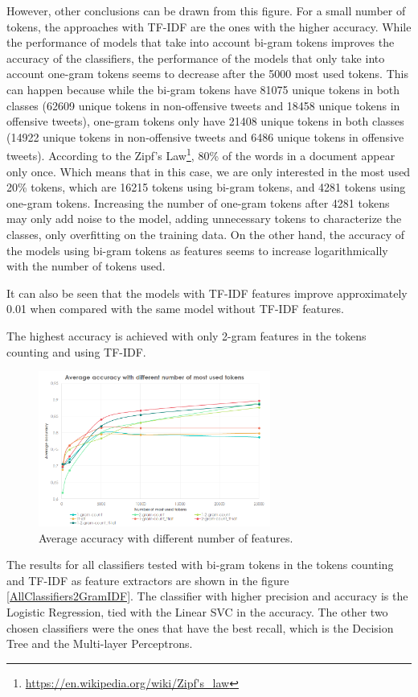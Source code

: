 \documentclass[journal]{IEEEtran}
\begin{document}
However, other conclusions can be drawn from this figure. For a small number of tokens, the approaches with TF-IDF are the ones with the higher accuracy. While the performance of models that take into account bi-gram tokens improves the accuracy of the classifiers, the performance of the models that only take into account one-gram tokens seems to decrease after the 5000 most used tokens. This can happen because while the bi-gram tokens have 81075 unique tokens in both classes (62609 unique tokens in non-offensive tweets and 18458 unique tokens in offensive tweets), one-gram tokens only have 21408 unique tokens in both classes (14922 unique tokens in non-offensive tweets and 6486 unique tokens in offensive tweets). According to the Zipf's Law\footnote{\url{https://en.wikipedia.org/wiki/Zipf's_law}}, 80\% of the words in a document appear only once. Which means that in this case, we are only interested in the most used 20\% tokens, which are 16215 tokens using bi-gram tokens, and 4281 tokens using one-gram tokens. Increasing the number of one-gram tokens after 4281 tokens may only add noise to the model, adding unnecessary tokens to characterize the classes, only overfitting on the training data. On the other hand, the accuracy of the models using bi-gram tokens as features seems to increase logarithmically with the number of tokens used.

It can also be seen that the models with TF-IDF features improve approximately 0.01 when compared with the same model without TF-IDF features.

The highest accuracy is achieved with only 2-gram features in the tokens counting and using TF-IDF.

\begin{figure}[!t]
\centering
\includegraphics[width=3in]{AccFeatures_w}
\caption{Average accuracy with different number of features.}
\label{averageAccFeatures}
\end{figure}

The results for all classifiers tested with bi-gram tokens in the tokens counting and TF-IDF as feature extractors are shown in the figure \ref{AllClassifiers2GramIDF}. The classifier with higher precision and accuracy is the Logistic Regression, tied with the Linear SVC in the accuracy. The other two chosen classifiers were the ones that have the best recall, which is the Decision Tree and the Multi-layer Perceptrons.
\end{document}
